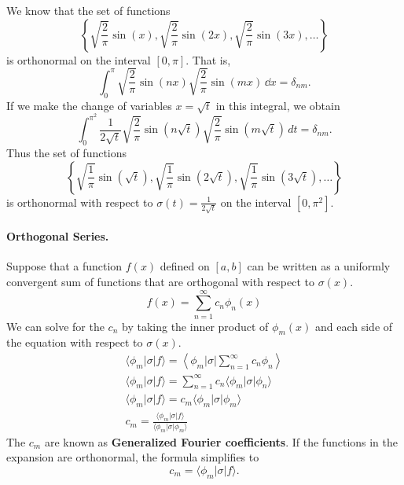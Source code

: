 \begin{Example}
  We know that the set of functions
  \[ \left\{ \sqrt{\frac{2}{\pi}} \sin(x), \sqrt{\frac{2}{\pi}} \sin(2 x),
    \sqrt{\frac{2}{\pi}} \sin(3 x), \ldots \right\} \]
  is orthonormal on the interval $[0, \pi]$.
  That is,
  \[ \int_0^\pi \sqrt{\frac{2}{\pi}} \sin(n x) 
  \sqrt{\frac{2}{\pi}} \sin(m x) \,\dd x = \delta_{nm}. \]
  If we make the change of variables $x = \sqrt{t}$ in this integral, we obtain
  \[ \int_0^{\pi^2} \frac{1}{2\sqrt{t}} \sqrt{\frac{2}{\pi}} \sin(n \sqrt{t})
  \sqrt{\frac{2}{\pi}} \sin(m \sqrt{t})\, d t = \delta_{nm}.\]
  Thus the set of functions
  \[ \left\{ \sqrt{\frac{1}{\pi}} \sin(\sqrt{t}), \sqrt{\frac{1}{\pi}} \sin(2\sqrt{t}),
    \sqrt{\frac{1}{\pi}} \sin(3\sqrt{t}), \ldots \right\} \]
  is orthonormal with respect to $\sigma(t) = \frac{1}{2 \sqrt{t}}$ on the interval
  $[0, \pi^2]$.
\end{Example}







\paragraph{Orthogonal Series.}
Suppose that a function $f(x)$ defined on $[a,b]$
can be written as a uniformly convergent sum of functions that are 
orthogonal with respect to $\sigma(x)$.
\[ f(x) = \sum_{n = 1}^\infty c_n \phi_n(x) \]
We can solve for the $c_n$ by taking the inner product of $\phi_m(x)$ and 
each side of the equation with respect to $\sigma(x)$. 
\begin{gather*}
  \langle \phi_m | \sigma | f \rangle = \left\langle \phi_m \Bigg| \sigma \Bigg| 
    \sum_{n = 1}^\infty c_n \phi_n \right\rangle \\
  \langle \phi_m | \sigma | f \rangle = \sum_{n = 1}^\infty c_n \langle \phi_m | \sigma | \phi_n 
  \rangle \\
  \langle \phi_m | \sigma | f \rangle = c_m \langle \phi_m | \sigma | \phi_m \rangle \\
  c_m = \frac{\langle \phi_m | \sigma | f \rangle}{\langle \phi_m  | \sigma | \phi_m \rangle}
\end{gather*}
The $c_m$ are known as \textbf{Generalized Fourier coefficients}.
If the functions in the expansion are orthonormal, the formula simplifies
to
\[ c_m = \langle \phi_m | \sigma | f \rangle. \]














